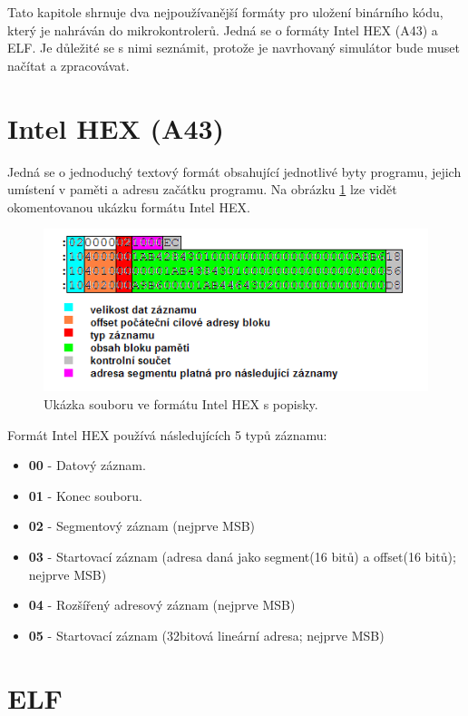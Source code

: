 Tato kapitole shrnuje dva nejpoužívanější formáty pro uložení binárního kódu, který je nahráván do mikrokontrolerů. Jedná se o formáty Intel HEX (A43) a ELF. Je důležité se s nimi seznámit, protože je navrhovaný simulátor bude muset načítat a zpracovávat.

\section{Intel HEX (A43)}

Jedná se o jednoduchý textový formát obsahující jednotlivé byty programu, jejich umístení v paměti a adresu začátku programu. Na obrázku \ref{fig:intelhex} lze vidět okomentovanou ukázku formátu Intel HEX.

\begin{figure}[ht]
\centering
\includegraphics[trim=0cm 0cm 0cm 0cm, scale=0.7]{fig/intelhex}
\caption{Ukázka souboru ve formátu Intel HEX s popisky.}
\label{fig:intelhex}
\end{figure}

Formát Intel HEX používá následujících 5 typů záznamu:

\begin{itemize}
\item \textbf{00} - Datový záznam.
\item \textbf{01} - Konec souboru.
\item \textbf{02} - Segmentový záznam (nejprve MSB)
\item \textbf{03} - Startovací záznam (adresa daná jako segment(16 bitů) a offset(16 bitů); nejprve MSB)
\item \textbf{04} - Rozšířený adresový záznam (nejprve MSB)
\item \textbf{05} - Startovací záznam (32bitová lineární adresa; nejprve MSB)
\end{itemize}

\section{ELF}

